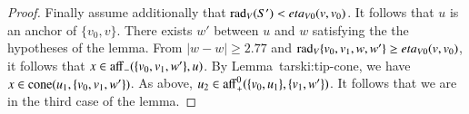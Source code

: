 \begin{tarskidata}
\begin{tarski}
\begin{proof}
Finally assume additionally that $\operatorname{rad}_V(S')<eta_{V0}(v,v_0)$.
It follows that $u$ is an anchor of $\{v_0,v\}$.
There exists $w'$ between $u$ and $w$
satisfying the the hypotheses of the lemma.
From $|w-w|\ge 2.77$ and $\operatorname{rad}_V\{v_0,v_1,w,w'\} \ge eta_{V0}(v,v_0)$,
it follows that $x\in {\operatorname{aff}}_-(\{v_0,v_1,w'\},u)$.  By Lemma~{tarski:tip-cone}, we have $x\in{\operatorname{cone}}(u_1,\{v_0,v_1,w'\})$.
As above, $u_2\in{\operatorname{aff}}_+^0(\{v_0,u_1\},\{v_1,w'\})$. 
It follows that we are in the third case of the lemma.
\end{proof}
\end{tarski}





\begin{tarski}


\end{tarski}
\end{tarskidata}
